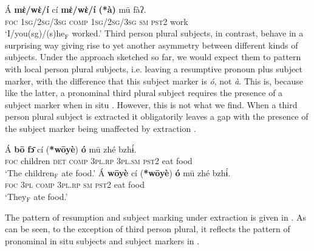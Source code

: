 \documentclass[output=paper]{langscibook}
\begin{document}
\ea \label{ex:johanneshein:singularSMextract}
\gll Á \textbf{mὲ/wὲ/í} cí \textbf{mὲ/wὲ/í} \textbf{(*à)} mū fàʔ.\label{ex:LDE-singular}\\
\textsc{foc} \textsc{1sg/2sg/3sg} \textsc{comp} \textsc{1sg/2sg/3sg} \hphantom{(*}\textsc{sm} \textsc{pst2} work\\
\glt `I/you(sg)/(s)he$_{\text{F}}$ worked.'
\z
Third person plural subjects, in contrast, behave in a surprising way
giving rise to yet another asymmetry between different kinds of
subjects. Under the approach sketched so far, we would expect them to
pattern with local person plural subjects, i.e. leaving a resumptive
pronoun plus subject marker, with the difference that this subject
marker is \textit{ó}, not \textit{à}. This is, because like the
latter, a pronominal third plural subject requires the presence of a
subject marker when in situ . However, this is
not what we find. When a third person plural subject is extracted it
obligatorily leaves a gap with the presence of the subject marker
being unaffected by extraction .

\ea\label{ex:johanneshein:PL-extract}
\begin{xlist}
\ex 
\gll Á \textbf{bō} \textbf{fɔ̄} cí (\textbf{*wōyè}) \textbf{ó} mū zhé bzhɨ́.\\
\textsc{foc} children \textsc{det} \textsc{comp} \hphantom{(*}\textsc{3pl.rp} \textsc{3pl.sm} \textsc{pst2} eat food\\
\glt `The children$_{\text{F}}$ ate food.'
\ex 
\gll Á \textbf{wōyè} cí (\textbf{*wōyè}) \textbf{ó} mū zhé bzhɨ́.\\
\textsc{foc} \textsc{3pl} \textsc{comp} \textsc{3pl.rp} \textsc{sm} \textsc{pst2} eat food\\
\glt `They$_{\text{F}}$ ate food.'
\end{xlist}
\z
The pattern of resumption and subject marking under extraction is
given in . As can be seen, to the exception of third person
plural, it reflects the pattern of pronominal in situ subjects and
subject markers in .
\end{document}
